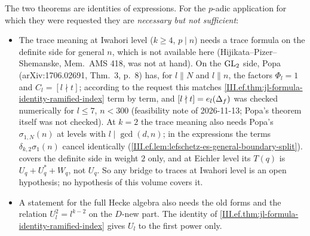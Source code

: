\begin{remark}\label{rem:ef-general-caveats}
The two theorems are identities of expressions. For the $p$-adic application for which they were requested they are \emph{necessary but not
sufficient}:
\begin{itemize}
\item The trace meaning at Iwahori level ($k\ge4$, $p\mid n$) needs a trace formula on the definite side for general $n$, which is not available
  here (Hijikata--Pizer--Shemanske, Mem.\ AMS 418, was not at hand). On the $\mathrm{GL}_2$ side, Popa (arXiv:1706.02691, Thm.~3, p.~8) has, for $l\parallel N$
  and $l\parallel n$, the factors $\Phi_l=1$ and $C_l=[l\nmid t]$; according to the request this matches
  \cref{III.ef.thm:jl-formula-identity-ramified-index} term by term, and $[l\nmid t]=e_l(\Delta_f)$ was checked numerically for $l\le7$, $n<300$
  (feasibility note of 2026-11-13; Popa's theorem itself was not checked). At $k=2$ the trace meaning also needs Popa's $\sigma_{1,N}(n)$ at levels with
  $l\mid\gcd(d,n)$; in the expressions the terms $\delta_{k,2}\sigma_1(n)$ cancel identically (\cref{III.ef.lem:lefschetz-es-general-boundary-split}).
  \cite[Main Thm.~41.5.2]{Voi} covers the definite side in weight $2$ only, and at Eichler level its $T(q)$ is $U_q+U_q^*+W_q$, not $U_q$.
  So any bridge to traces at Iwahori level is an open hypothesis; no hypothesis of this volume covers it.
\item A statement for the full Hecke algebra also needs the old forms and the relation $U_l^2=l^{k-2}$ on the $D$-new part. The identity
  of \cref{III.ef.thm:jl-formula-identity-ramified-index} gives $U_l$ to the first power only.
\end{itemize}
\end{remark}
